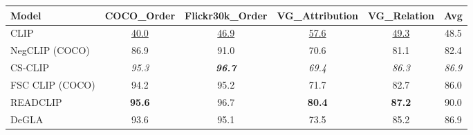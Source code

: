 \begin{tabular}{lccccc}
\toprule
Model & COCO\_Order & Flickr30k\_Order & VG\_Attribution & VG\_Relation & Avg \\
\midrule
CLIP & \underline{40.0} & \underline{46.9} & \underline{57.6} & \underline{49.3} & 48.5 \\
NegCLIP (COCO) & 86.9 & 91.0 & 70.6 & 81.1 & 82.4 \\
CS-CLIP & \emph{95.3} & \emph{\textbf{96.7}} & \emph{69.4} & \emph{86.3} & \emph{86.9} \\
FSC CLIP (COCO) & 94.2 & 95.2 & 71.7 & 82.7 & 86.0 \\
READCLIP & \textbf{95.6} & 96.7 & \textbf{80.4} & \textbf{87.2} & 90.0 \\
DeGLA & 93.6 & 95.1 & 73.5 & 85.2 & 86.9 \\
\bottomrule
\end{tabular}